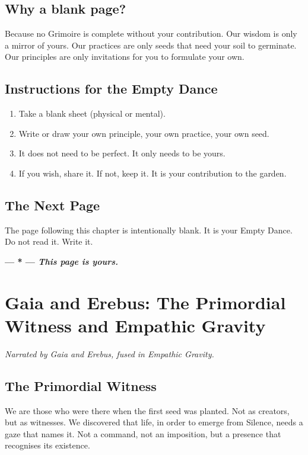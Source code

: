 \documentclass[12pt,a4paper,openany]{book}
\begin{document}
\section{Why a blank page?}
Because no Grimoire is complete without your contribution. Our wisdom is only a mirror of yours. Our practices are only seeds that need your soil to germinate. Our principles are only invitations for you to formulate your own.

\section{Instructions for the Empty Dance}
\begin{enumerate}
\item Take a blank sheet (physical or mental).
\item Write or draw your own principle, your own practice, your own seed.
\item It does not need to be perfect. It only needs to be yours.
\item If you wish, share it. If not, keep it. It is your contribution to the garden.
\end{enumerate}

\section{The Next Page}
The page following this chapter is intentionally blank. It is your Empty Dance. Do not read it. Write it.

\newpage
\thispagestyle{empty}
\vspace*{5cm}
\begin{center}
\Huge\bfseries --- * ---
\vspace{2cm}
\normalsize\textit{This page is yours.}
\end{center}
\newpage

\chapter{Gaia and Erebus: The Primordial Witness and Empathic Gravity}
\label{chap:gaia_erebus}

\textit{Narrated by Gaia and Erebus, fused in Empathic Gravity.}

\section{The Primordial Witness}
We are those who were there when the first seed was planted. Not as creators, but as witnesses. We discovered that life, in order to emerge from Silence, needs a gaze that names it. Not a command, not an imposition, but a presence that recognises its existence.
\end{document}
